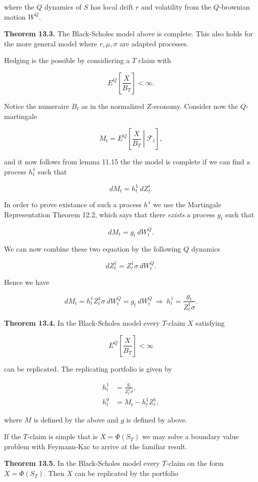 \documentclass[
]{article}
\begin{document}
where the \(Q\) dynamics of \(S\) has local drift \(r\) and volatility
from the \(Q\)-brownian motion \(W^Q\).

\textbf{Theorem 13.3.} The Black-Scholes model above is complete. This
also holds for the more general model where \(r,\mu,\sigma\) are adapted
processes.

Hedging is the possible by considiering a \(T\) claim with

\[
E^Q\left[\frac{X}{B_T}\right]<\infty.
\]

Notice the numeraire \(B_t\) as in the normalized \(Z\)-economy.
Consider now the \(Q\)-martingale

\[
M_t=E^Q\left[\left. \frac{X}{B_T}\ \right\vert\ \mathcal{F}_t\right],
\]

and it now follows from lemma 11.15 the the model is complete if we can
find a process \(h_t^1\) such that

\[
dM_t=h_t^1\ dZ_t^i.
\]

In order to prove existance of such a process \(h^1\) we use the
Martingale Representation Theorem 12.2, which says that there
\emph{exists} a process \(g_t\) such that

\[
dM_t=g_t\ dW_t^Q.
\]

We can now combine these two equation by the following \(Q\) dynamics

\[
dZ_t^1=Z_t^1\sigma\ dW_t^Q.
\]

Hence we have

\[
dM_t=h_t^1Z_t^1\sigma\ dW_t^Q=g_t\ dW_t^Q\ \Rightarrow\ h_t^1=\frac{g_t}{Z_t^1\sigma}.
\]

\textbf{Theorem 13.4.} In the Black-Scholes model every \(T\)-claim
\(X\) satisfying

\[
E^Q\left[\frac{X}{B_T}\right]<\infty
\]

can be replicated. The replicating portfolio is given by

\begin{align*}
h_t^1&=\frac{g_t}{Z_t^1\sigma},\\
h_t^0&=M_t-h_t^1Z_t^1,
\end{align*}

where \(M\) is defined by the above and \(g\) is defined by above.

If the \(T\)-claim is simple that is \(X=\Phi(S_T)\) we may solve a
boundary value problem with Feymann-Kac to arrive at the familiar
result.

\textbf{Theorem 13.5.} In the Black-Scholes model every \(T\)-claim on
the form \(X=\Phi(S_T)\). Then \(X\) can be replicated by the portfolio
\end{document}
